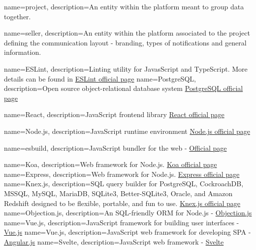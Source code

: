 {
        name=project,
        description={An entity within the platform meant to group data together.}
}

{
        name=seller,
        description={An entity within the platform associated to the project defining the communication layout - branding, types of notifications and general information.}
}

{
        name=ESLint,
        description={Linting utility for JavasScript and TypeScript. More details can be found in \href{https://eslint.org}{ESLint official page}}
}
{
        name=PostgreSQL,
        description={Open source object-relational database system \href{https://www.postgresql.org}{PostgreSQL official page}}
}

{
        name=React,
        description={JavaScript frontend library \href{https://react.dev}{React official page}}
}

{
        name=Node.js,
        description={JavaScript runtime environment \href{https://nodejs.org/en}{Node.js official page}}
}

{
        name=esbuild,
        description={JavaScript bundler for the web - \href{https://esbuild.github.io}{Official page}}
}

{
        name=Koa,
        description={Web framework for Node.js. \href{https://koajs.com}{Koa official page}}
}
{
        name=Express,
        description={Web framework for Node.js. \href{https://expressjs.com}{Express official page}}
}
{
        name=Knex.js,
        description={SQL query builder for PostgreSQL, CockroachDB, MSSQL, MySQL, MariaDB, SQLite3, Better-SQLite3, Oracle, and Amazon Redshift designed to be flexible, portable, and fun to use. \href{https://knexjs.org}{Knex.js official page}}
}
{
        name=Objection.js,
        description={An SQL-friendly ORM for Node.js - \href{https://vincit.github.io/objection.js/}{Objection.js}}
}
{
        name=Vue.js,
        description={JavaScript framework for building user interfaces - \href{https://vuejs.org}{Vue.js}}
}
{
        name=Vue.js,
        description={JavaScript web framework for developing SPA - \href{https://angularjs.org}{Angular.js}}
}
{
        name=Svelte,
        description={JavaScript web framework - \href{https://svelte.dev}{Svelte}}
}

